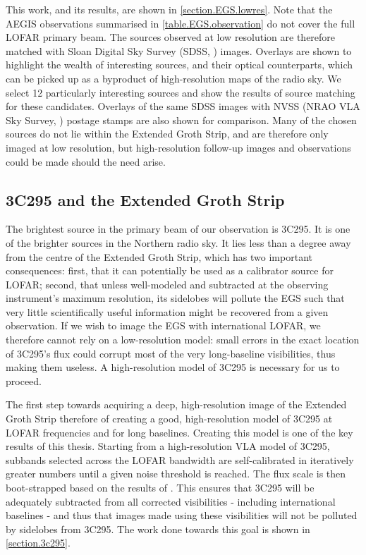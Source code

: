 \pg
This work, and its results, are shown in \cref{section.EGS.lowres}. Note that the AEGIS observations summarised in \cref{table.EGS.observation} do not cover the full LOFAR primary beam. The sources observed at low resolution are therefore matched with Sloan Digital Sky Survey (SDSS, ) images. Overlays are shown to highlight the wealth of interesting sources, and their optical counterparts, which can be picked up as a byproduct of high-resolution maps of the radio sky. We select 12 particularly interesting sources and show the results of source matching for these candidates. Overlays of the same SDSS images with NVSS (NRAO VLA Sky Survey, ) postage stamps are also shown for comparison. Many of the chosen sources do not lie within the Extended Groth Strip, and are therefore only imaged at low resolution, but high-resolution follow-up images and observations could be made should the need arise.


\subsection{3C295 and the Extended Groth Strip}


\pg
The brightest source in the primary beam of our observation is 3C295. It is one of the brighter sources in the Northern radio sky. It lies less than a degree away from the centre of the Extended Groth Strip, which has two important consequences: first, that it can potentially be used as a calibrator source for LOFAR; second, that unless well-modeled and subtracted at the observing instrument's maximum resolution, its sidelobes will pollute the EGS such that very little scientifically useful information might be recovered from a given observation. If we wish to image the EGS with international LOFAR, we therefore cannot rely on a low-resolution model: small errors in the exact location of 3C295's flux could corrupt most of the very long-baseline visibilities, thus making them useless. A high-resolution model of 3C295 is necessary for us to proceed.

\pg
The first step towards acquiring a deep, high-resolution image of the Extended Groth Strip therefore of creating a good, high-resolution model of 3C295 at LOFAR frequencies and for long baselines. Creating this model is one of the key results of this thesis. Starting from a high-resolution VLA model of 3C295, subbands selected across the LOFAR bandwidth are self-calibrated in iteratively greater numbers until a given noise threshold is reached. The flux scale is then boot-strapped based on the results of \citet{arse}. This ensures that 3C295 will be adequately subtracted from all corrected visibilities - including international baselines - and thus that images made using these visibilities will not be polluted by sidelobes from 3C295. 
The work done towards this goal is shown in \cref{section.3c295}. %
%

